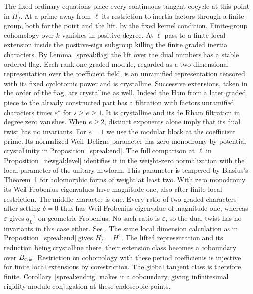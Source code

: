 The fixed ordinary equations place every continuous tangent cocycle
at this point in \(H^1_f\).
At a prime away from \(\ell\) its restriction to inertia factors
through a finite group, both for the point and the lift, by the
fixed kernel condition. Finite-group cohomology over \(k\) vanishes
in positive degree. At \(\ell\) pass to a finite local extension
inside the positive-sign subgroup killing the finite graded inertia
characters. By Lemma~\ref{spreal:flag} the lift over the dual numbers
has a stable ordered flag. Each rank-one graded module, regarded as
a two-dimensional representation over the coefficient field, is an
unramified representation tensored with its fixed cyclotomic power
and is crystalline. Successive extensions, taken in the order of the
flag, are crystalline as well. Indeed the Hom from a later graded
piece to the already constructed part has a filtration with factors
unramified characters times \(\varepsilon^s\) for \(s\ge e\ge1\).
It is crystalline and its de Rham filtration in degree zero vanishes.
When \(e\ge2\), distinct exponents alone imply that its dual twist
has no invariants. For \(e=1\) we use the modular block at the
coefficient prime. Its normalized Weil--Deligne parameter has zero
monodromy by potential crystallinity in Proposition~\ref{spreal:end}.
The full comparison at \(\ell\) in Proposition~\ref{newgal:level}
identifies it in the weight-zero normalization with the local
parameter of the unitary newform. This parameter is tempered by
Blasius's Theorem~1 for holomorphic forms of weight at least two.
With zero monodromy its Weil Frobenius eigenvalues have magnitude
one, also after finite local restriction. The middle character is one.
Every ratio of two graded characters after setting \(\delta=0\)
thus has Weil Frobenius eigenvalue of magnitude one, whereas
\(\varepsilon\) gives \(q_L^{-1}\) on geometric Frobenius.
No such ratio is \(\varepsilon\), so the dual twist has no invariants
in this case either.
See \cite[Theorem 1]{blasiusRam}.
The same local dimension
calculation as in Proposition~\ref{spreal:end} gives \(H_f^1=H^1\).
The lifted representation and its reduction being crystalline there,
their extension class becomes a coboundary over \(B_{\rm cris}\).
Restriction on cohomology with these period coefficients is injective
for finite local extensions by corestriction. The global tangent
class is therefore finite. Corollary~\ref{spreal:endrig} makes it a
coboundary, giving infinitesimal rigidity modulo conjugation at
these endoscopic points.

